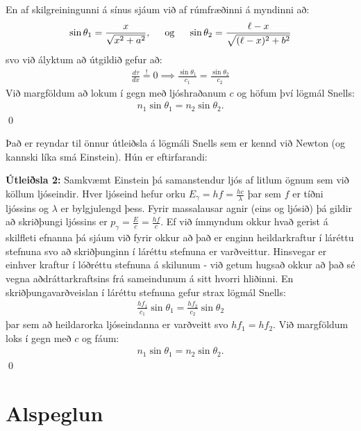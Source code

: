 \vspace{0.25cm}

En af skilgreiningunni á sínus sjáum við af rúmfræðinni á myndinni að:
\begin{align*}
    \sin\theta_1 = \frac{x}{\sqrt{x^2+a^2}}, \hspace{0.5cm} \text{og} \hspace{0.5cm} \sin\theta_2 = \frac{\ell-x}{\sqrt{(\ell-x)^2+b^2}}
\end{align*}
svo við ályktum að útgildið gefur að:
\begin{align*}
   \frac{d\tau}{dx} \stackrel{!}{=} 0 \implies \frac{\sin\theta_1}{c_1} = \frac{\sin\theta_2}{c_2}
\end{align*}
Við margföldum að lokum í gegn með ljóshraðanum $c$ og höfum því lögmál Snells:
\begin{align*}
            n_1 \sin\theta_1 = n_2 \sin\theta_2.
\end{align*}
\qed

Það er reyndar til önnur útleiðsla á lögmáli Snells sem er kennd við Newton (og kannski líka smá Einstein). Hún er eftirfarandi:

\textbf{Útleiðsla 2:} Samkvæmt Einstein þá samanstendur ljós af litlum ögnum sem við köllum ljóseindir. Hver ljóseind hefur orku $E_\gamma = hf = \frac{hc}{\lambda}$ þar sem $f$ er tíðni ljóssins og $\lambda$ er bylgjulengd þess. Fyrir massalausar agnir (eins og ljósið) þá gildir að skriðþungi ljóssins er $p_\gamma = \frac{E}{c} = \frac{hf}{c}$. Ef við ímmyndum okkur hvað gerist á skilfleti efnanna þá sjáum við fyrir okkur að það er enginn heildarkraftur í láréttu stefnuna svo að skriðþunginn í láréttu stefnuna er varðveittur. Hinsvegar er einhver kraftur í lóðréttu stefnuna á skilunum - við getum hugsað okkur að það sé vegna aðdráttarkraftsins frá sameindunum á sitt hvorri hliðinni. En skriðþungavarðveislan í láréttu stefnuna gefur strax lögmál Snells:
\begin{align*}
    \frac{hf_1}{c_1}\sin\theta_1 = \frac{hf_2}{c_2}\sin\theta_2
\end{align*}
þar sem að heildarorka ljóseindanna er varðveitt svo $hf_1 = hf_2$. Við margföldum loks í gegn með $c$ og fáum:
\begin{align*}
    n_1 \sin\theta_1 = n_2 \sin\theta_2.
\end{align*}
\qed

\section{Alspeglun}

